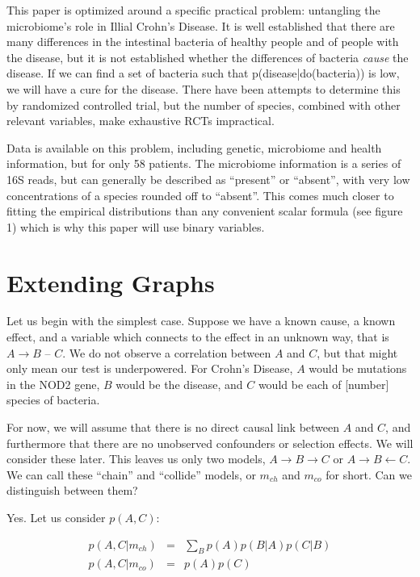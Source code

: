 \documentclass[twocolumn,12pt]{article}
\begin{document}
This paper is optimized around a specific practical problem:
untangling the microbiome's role in Illial Crohn's Disease.  It is
well established that there are many differences in the intestinal
bacteria of healthy people and of people with the disease, but it is
not established whether the differences of bacteria \textit{cause} the
disease.  If we can find a set of bacteria such that
p(disease|do(bacteria)) is low, we will have a cure for the disease.
There have been attempts to determine this by randomized controlled
trial, but the number of species, combined with other relevant
variables, make exhaustive RCTs impractical.

Data is available on this problem, including genetic, microbiome and
health information, but for only 58 patients.  The microbiome
information is a series of 16S reads, but can generally be described
as ``present'' or ``absent'', with very low concentrations of a
species rounded off to ``absent''.  This comes much closer to fitting
the empirical distributions than any convenient scalar formula (see
figure 1) which is why this paper will use binary variables.

\section{Extending Graphs}

Let us begin with the simplest case.  Suppose we have a known cause, a
known effect, and a variable which connects to the effect in an
unknown way, that is $A \rightarrow B$ -- $C$.  We do not observe a
correlation between $A$ and $C$, but that might only mean our test is
underpowered.  For Crohn's Disease, $A$ would be mutations in the NOD2
gene, $B$ would be the disease, and $C$ would be each of [number]
species of bacteria.

For now, we will assume that there is no direct causal
link between $A$ and $C$, and furthermore that there are no unobserved
confounders or selection effects.  We will consider these later.
This leaves us only two models, $A \rightarrow B \rightarrow C$ or $A
\rightarrow B \leftarrow C$.  We can call these ``chain'' and
``collide'' models, or $m_{ch}$ and $m_{co}$ for short.  Can we
distinguish between them?

Yes.  Let us consider
$p(A,C)$:

\begin{eqnarray*}
p(A,C|m_{ch}) & = & \sum_B p(A)p(B|A)p(C|B) \\
p(A,C|m_{co}) & = & p(A)p(C)
\end{eqnarray*}
\end{document}
